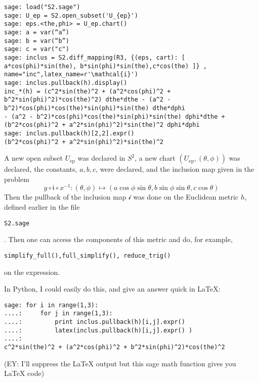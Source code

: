 \documentclass[10pt, twoside]{amsart}
\begin{document}
\begin{multicols*}{2}
{\scriptsize \begin{verbatim}
sage: load("S2.sage")
sage: U_ep = S2.open_subset('U_{ep}')
sage: eps.<the,phi> = U_ep.chart()
sage: a = var(“a”)
sage: b = var(“b”)
sage: c = var("c")
sage: inclus = S2.diff_mapping(R3, {(eps, cart): [ a*cos(phi)*sin(the), b*sin(phi)*sin(the),c*cos(the) ]} , name="inc",latex_name=r'\mathcal{i}')
sage: inclus.pullback(h).display()
inc_*(h) = (c^2*sin(the)^2 + (a^2*cos(phi)^2 + b^2*sin(phi)^2)*cos(the)^2) dthe*dthe - (a^2 - b^2)*cos(phi)*cos(the)*sin(phi)*sin(the) dthe*dphi 
- (a^2 - b^2)*cos(phi)*cos(the)*sin(phi)*sin(the) dphi*dthe + (b^2*cos(phi)^2 + a^2*sin(phi)^2)*sin(the)^2 dphi*dphi
sage: inclus.pullback(h)[2,2].expr()
(b^2*cos(phi)^2 + a^2*sin(phi)^2)*sin(the)^2
\end{verbatim}
}
A new open subset $U_{\text{ep}}$ was declared in $S^2$, a new chart $(U_{\text{ep}}, (\theta,\phi))$ was declared, the constants, $a,b,c$, were declared, and the inclusion map given in the problem
\[
y\circ \mathfrak{i} \circ x^{-1} : (\theta, \phi) \mapsto ( a\cos{\phi} \sin{\theta}, b \sin{\phi} \sin{\theta}, c\cos{\theta})
\]
Then the pullback of the inclusion map $\mathcal{i}$ was done on the Euclidean metric $h$, defined earlier in the file \begin{verbatim}S2.sage\end{verbatim}.  Then one can access the components of this metric and do, for example, \begin{verbatim}simplify_full(),full_simplify(), reduce_trig()\end{verbatim} on the expression.  

In Python, I could easily do this, and give an answer quick in LaTeX:

\begin{verbatim}
sage: for i in range(1,3): 
....:     for j in range(1,3):
....:         print inclus.pullback(h)[i,j].expr()
....:         latex(inclus.pullback(h)[i,j].expr() )
....:         
c^2*sin(the)^2 + (a^2*cos(phi)^2 + b^2*sin(phi)^2)*cos(the)^2
\end{verbatim}
(EY: I'll suppress the LaTeX output but this sage math function gives you LaTeX code)
%
%


\end{multicols*}
\end{document}
